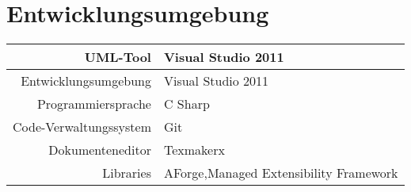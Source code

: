 \chapter{Entwicklungsumgebung}
\begin{tabular}{r|l}
UML-Tool & Visual Studio 2011 \\ 
\hline 
Entwicklungsumgebung & Visual Studio 2011 \\ 
\hline 
Programmiersprache & C Sharp \\ 
\hline 
Code-Verwaltungssystem & Git \\ 
\hline 
Dokumenteneditor & Texmakerx \\ 
\hline 
Libraries & AForge,Managed Extensibility Framework \\ 
\end{tabular}